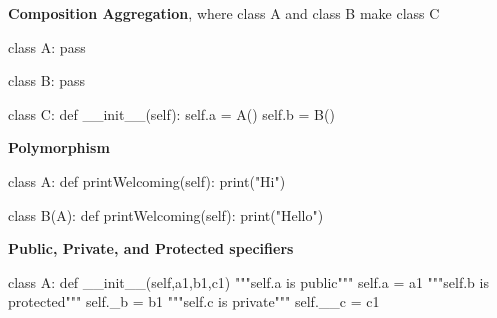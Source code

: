 	\textbf{Composition Aggregation}, where class A and class B make class C

\begin{python}
class A:
    pass

class B:
    pass

class C:
    def __init__(self):
        self.a = A()
        self.b = B()
\end{python}

	\textbf{Polymorphism}
\begin{python}
class A:
	def printWelcoming(self):
		print("Hi")

class B(A):
	def printWelcoming(self):
		print("Hello")
\end{python}

	\textbf{Public, Private, and Protected specifiers}

\begin{python}
class A:
	def __init__(self,a1,b1,c1)
		"""self.a is public"""
		self.a = a1
		"""self.b is protected"""
		self._b = b1
		"""self.c is private"""
		self.__c = c1

\end{python}
